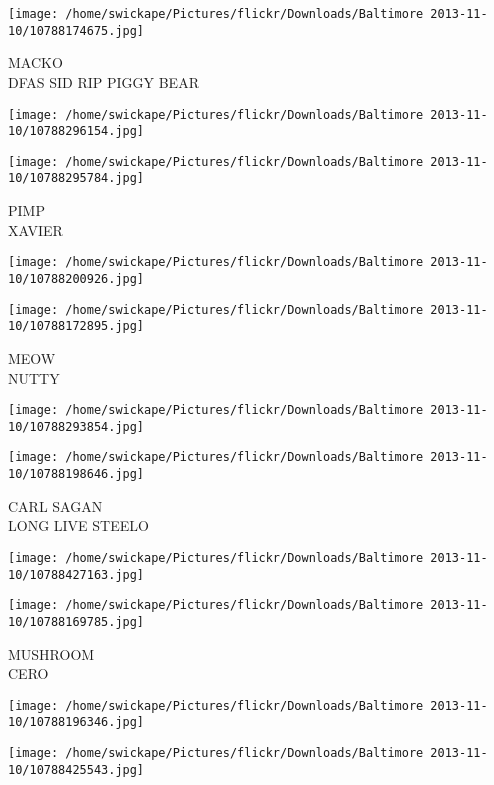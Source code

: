 \documentclass[10pt,letterpaper]{article}
\begin{document}
\vspace{0.25in}
\texttt{[image: /home/swickape/Pictures/flickr/Downloads/Baltimore 2013-11-10/10788174675.jpg]}

MACKO\\
DFAS SID RIP PIGGY BEAR
\pagebreak

\texttt{[image: /home/swickape/Pictures/flickr/Downloads/Baltimore 2013-11-10/10788296154.jpg]}

\vspace{0.25in}
\texttt{[image: /home/swickape/Pictures/flickr/Downloads/Baltimore 2013-11-10/10788295784.jpg]}

PIMP\\
XAVIER
\pagebreak

\texttt{[image: /home/swickape/Pictures/flickr/Downloads/Baltimore 2013-11-10/10788200926.jpg]}

\vspace{0.25in}
\texttt{[image: /home/swickape/Pictures/flickr/Downloads/Baltimore 2013-11-10/10788172895.jpg]}

MEOW\\
NUTTY
\pagebreak

\texttt{[image: /home/swickape/Pictures/flickr/Downloads/Baltimore 2013-11-10/10788293854.jpg]}

\vspace{0.25in}
\texttt{[image: /home/swickape/Pictures/flickr/Downloads/Baltimore 2013-11-10/10788198646.jpg]}

CARL SAGAN\\
LONG LIVE STEELO
\pagebreak

\texttt{[image: /home/swickape/Pictures/flickr/Downloads/Baltimore 2013-11-10/10788427163.jpg]}

\vspace{0.25in}
\texttt{[image: /home/swickape/Pictures/flickr/Downloads/Baltimore 2013-11-10/10788169785.jpg]}

MUSHROOM\\
CERO
\pagebreak

\texttt{[image: /home/swickape/Pictures/flickr/Downloads/Baltimore 2013-11-10/10788196346.jpg]}

\vspace{0.25in}
\texttt{[image: /home/swickape/Pictures/flickr/Downloads/Baltimore 2013-11-10/10788425543.jpg]}
\end{document}
